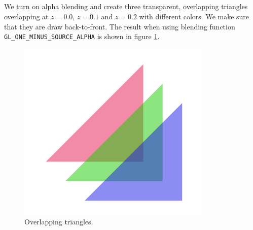 \documentclass[]{article}
\begin{document}
\begin{multicols}{2}
\subsection{}
We turn on alpha blending and create three transparent, overlapping triangles overlapping at $z = 0.0$, $z=0.1$ and $z=0.2$ with different colors. We make sure that they are draw back-to-front. The result when using blending function \texttt{GL\_ONE\_MINUS\_SOURCE\_ALPHA} is shown in figure \ref{fig:overlap}.
\begin{figure}[H]
\centering
\includegraphics[width=0.5\columnwidth]{overlap.png}
\caption{Overlapping triangles.}
\label{fig:overlap}
\end{figure}
\subsection{}

\end{multicols}
\end{document}
